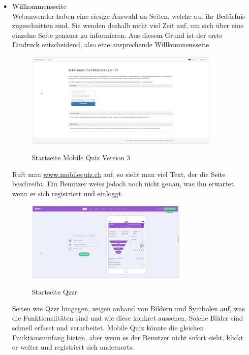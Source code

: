 	\begin{itemize}
		\item Willkommensseite \\
		Webanwender haben eine riesige Auswahl an Seiten, welche auf ihr Bedürfnis zugeschnitten sind. Sie wenden deshalb nicht viel Zeit auf, um sich über eine einzelne Seite genauer zu informieren. Aus diesem Grund ist der erste Eindruck entscheidend, also eine ansprechende Willkommensseite. \\
		
		\begin{figure}[H]
			\centering
			\includegraphics[width=0.9\textwidth]{Images/MobileQuiz_StartPage.PNG}
			\caption{Startseite Mobile Quiz Version 3}
			\cite{mobilequiz.ch}
		\end{figure}
		
		Ruft man \url{www.mobilequiz.ch} auf, so sieht man viel Text, der die Seite beschreibt. Ein Benutzer weiss jedoch noch nicht genau, was ihn erwartet, wenn er sich registriert und einloggt.
		
		\begin{figure}[H]
			\centering
			\includegraphics[width=0.75\textwidth]
			{Images/Qzzr_StartPage_Statistics.PNG}
			\caption{Startseite Qzzr}
			\cite{qzzr.com}
		\end{figure}
				
		Seiten wie Qzzr \cite{qzzr.com} hingegen, zeigen anhand von Bildern und Symbolen auf, was die Funktionalitäten sind und wie diese konkret aussehen. Solche Bilder sind schnell erfasst  und verarbeitet.
		Mobile Quiz könnte die gleichen Funktionsumfang bieten, aber wenn es der Benutzer nicht sofort sieht, klickt er weiter und registriert sich andernorts.
		

\end{itemize}
